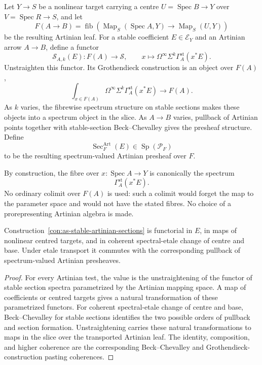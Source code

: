 \begin{construction}
\label{con:as-stable-artinian-sections}
Let $Y\to S$ be a nonlinear target carrying a centre
$U=\operatorname{Spec}B\to Y$ over
$V=\operatorname{Spec}R\to S$, and let
\[
    F(A\to B)
    =
    \operatorname{fib}
    \left(
        \operatorname{Map}_S(\operatorname{Spec}A,Y)
        \to
        \operatorname{Map}_S(U,Y)
    \right)
\]
be the resulting Artinian leaf.  For a stable coefficient
$E\in\mathcal E_Y$ and an Artinian arrow $A\to B$, define a functor
\[
    \mathscr S_{A,k}(E):F(A)\longrightarrow\mathcal S,
    \qquad
    x\longmapsto
    \Omega^\infty\Sigma^k\Gamma_A^{\mathrm{st}}(x^*E).
\]
Unstraighten this functor.  Its Grothendieck construction is an object over
$F(A)$,
\[
\boxed{
    \int_{x\in F(A)}
    \Omega^\infty\Sigma^k
    \Gamma_A^{\mathrm{st}}(x^*E)
    \longrightarrow F(A).
}
\]
As $k$ varies, the fibrewise spectrum structure on stable sections makes these
objects into a spectrum object in the slice.  As $A\to B$ varies, pullback of
Artinian points together with stable-section Beck--Chevalley gives the
presheaf structure.  Define
\[
\boxed{
    \operatorname{Sec}^{\mathrm{Art}}_F(E)
    \in
    \operatorname{Sp}(\mathcal P_F)
}
\]
to be the resulting spectrum-valued Artinian presheaf over $F$.

By construction, the fibre over
$x:\operatorname{Spec}A\to Y$ is canonically the spectrum
\[
    \Gamma_A^{\mathrm{st}}(x^*E).
\]
No ordinary colimit over $F(A)$ is used: such a colimit would forget the map
to the parameter space and would not have the stated fibres.  No choice of a
prorepresenting Artinian algebra is made.
\end{construction}

\begin{proposition}
\label{prop:as-stable-artinian-sections-functorial}
Construction~\ref{con:as-stable-artinian-sections} is functorial in $E$, in
maps of nonlinear centred targets, and in coherent spectral-etale change of
centre and base.  Under etale transport it commutes with the corresponding
pullback of spectrum-valued Artinian presheaves.
\end{proposition}

\begin{proof}
For every Artinian test, the value is the unstraightening of the functor of
stable section spectra parametrized by the Artinian mapping space.  A map of
coefficients or centred targets gives a natural transformation of these
parametrized functors.  For coherent spectral-etale change of centre and base,
Beck--Chevalley for stable sections identifies the two possible orders of
pullback and section formation.  Unstraightening carries these natural
transformations to maps in the slice over the transported Artinian leaf.  The
identity, composition, and higher coherence are the corresponding
Beck--Chevalley and Grothendieck-construction pasting coherences.
\end{proof}

